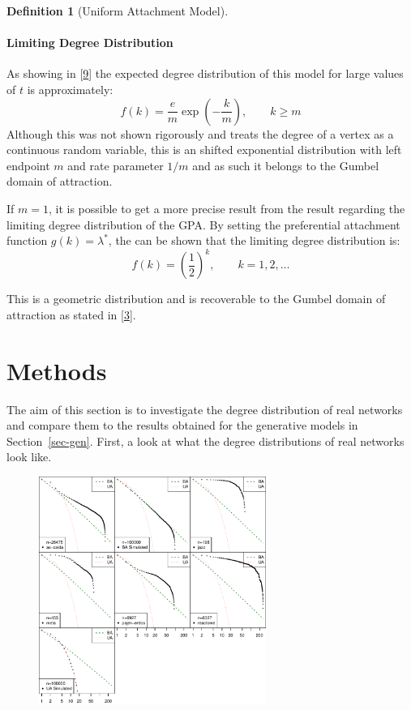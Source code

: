 \documentclass[
  10pt,
  a4paper,
]{scrreprt}
\theoremstyle{definition}
\newtheorem{definition}{Definition}[section]
\theoremstyle{plain}
\theoremstyle{plain}
\theoremstyle{plain}
\theoremstyle{remark}
\begin{document}
{\begin{definition}[Uniform Attachment
Model]
\end{definition}

\hypertarget{limiting-degree-distribution-2}{%
\subsubsection{Limiting Degree
Distribution}\label{limiting-degree-distribution-2}}

As showing in {[}\protect\hyperlink{ref-Barabasi99}{9}{]} the expected
degree distribution of this model for large values of \(t\) is
approximately: \[
f(k) = \displaystyle\frac{e}{m}\exp\left(-\displaystyle\frac{k}{m}\right),\qquad k \ge m
\] Although this was not shown rigorously and treats the degree of a
vertex as a continuous random variable, this is an shifted exponential
distribution with left endpoint \(m\) and rate parameter \(1/m\) and as
such it belongs to the Gumbel domain of attraction.

If \(m=1\), it is possible to get a more precise result from the result
regarding the limiting degree distribution of the GPA. By setting the
preferential attachment function \(g(k) = \lambda^*\), the can be shown
that the limiting degree distribution is: \[
f(k) = \left(\frac{1}{2} \right)^{k}, \qquad k=1,2,\ldots 
\]

This is a geometric distribution and is recoverable to the Gumbel domain
of attraction as stated in {[}\protect\hyperlink{ref-shimura12}{3}{]}.

\hypertarget{sec-meth}{%
\chapter{Methods}\label{sec-meth}}

The aim of this section is to investigate the degree distribution of
real networks and compare them to the results obtained for the
generative models in Section~\ref{sec-gen}. First, a look at what the
degree distributions of real networks look like.

\begin{figure}[H]

{\centering \includegraphics[width=0.66\textwidth,height=\textheight]{doc_files/figure-pdf/fig-survs-1.pdf}

}
\end{figure}}
\end{document}
